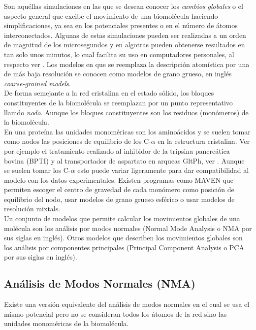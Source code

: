 Son aqu\'{e}llas simulaciones en las que se desean conocer los \textit{cambios globales} o el aspecto general que excibe el movimiento de una biomol\'{e}cula haciendo simplificaciones, ya sea en los potenciales presentes o en el n\'{u}mero de \'{a}tomos interconectados. Algunas de estas simulaciones pueden ser realizadas a un orden de magnitud de los microsegundos y en algotras pueden obtenerse resultados en tan solo unos minutos, lo cual facilita su uso en computadores personales, al respecto ver \cite{Gur2013}. Los modelos en que se reemplaza la descripci\'{o}n atom\'{i}stica por una de m\'{a}s baja resoluci\'{o}n se conocen como modelos de grano grueso, en ingl\'{e}s \textit{coarse-grained models}.\\

De forma semejante a la red cristalina en el estado s\'{o}lido, los bloques constituyentes de la biomol\'{e}cula se reemplazan  por un punto representativo llamdo \textit{nodo}. Aunque los bloques constituyentes son los residuos (mon\'{o}meros) de la biomol\'{e}cula.\\

En una prote\'{i}na las unidades monom\'{e}ricas son los amino\'{a}cidos y  se suelen tomar como nodos las posiciones de equilibrio de los C-$\alpha$ en la estructura cristalina. Ver por ejemplo el tratamiento realizado al inhibidor de la tripsina pancre\'{a}tica bovina (BPTI) y al transportador de aspartato en arqueas GltPh, ver \cite{Gur2013}. Aunque se suelen tomar los C-$\alpha$ esto puede variar ligeramente para dar compatibilidad al modelo con los datos experimentales. Existen programas como MAVEN \cite{Zimmermann2011} que permiten escoger el centro de gravedad de cada mon\'{o}mero como posici\'{o}n de equilibrio del nodo, usar modelos de grano grueso esf\'{e}rico o usar modelos de resoluci\'{o}n mixtals.\\
Un conjunto de modelos que permite calcular los movimientos globales de una mol\'{e}cula son los an\'{a}lisis por modos normales (Normal Mode Analysis o NMA por sus siglas en ingl\'{e}s).
 Otros modelos que describen los movimientos globales son los an\'{a}lisis por componentes principales (Principal Component Analysis o PCA por sus siglas en ingl\'{e}s).
 \subsection{An\'{a}lisis de Modos Normales (NMA)}
Existe una versi\'{o}n equivalente del an\'{a}lisis de modos normales en el cual se usa el mismo potencial pero no se consideran todos los \'{a}tomos de la red sino las unidades monom\'{e}ricas de la biomol\'{e}cula.
